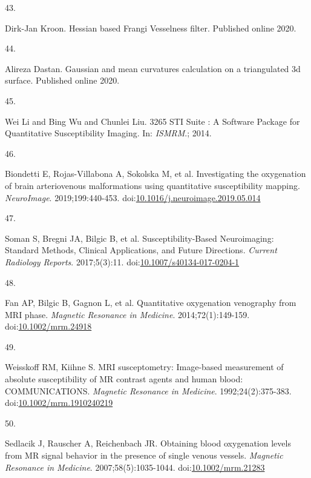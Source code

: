 \documentclass[
  letterpaper,
  DIV=11,
  numbers=noendperiod]{scrartcl}
\newlength{\cslhangindent}
\newlength{\csllabelwidth}
\newenvironment{CSLReferences}[2] %
 {\begin{list}{}{%
  \setlength{\itemindent}{0pt}
  \setlength{\leftmargin}{0pt}
  \setlength{\parsep}{0pt}
  \ifodd #1
   \setlength{\leftmargin}{\cslhangindent}
   \setlength{\itemindent}{-1\cslhangindent}
  \fi
  \setlength{\itemsep}{#2\baselineskip}}}
 {\end{list}}
\newcommand{\CSLLeftMargin}[1]{\parbox[t]{\csllabelwidth}{\strut#1\strut}}
\newcommand{\CSLRightInline}[1]{\parbox[t]{\linewidth - \csllabelwidth}{\strut#1\strut}}
\begin{document}
\begin{CSLReferences}{0}{1}
\CSLLeftMargin{43. }%
\CSLRightInline{Dirk-Jan Kroon. Hessian based {Frangi Vesselness}
filter. Published online 2020.}

\CSLLeftMargin{44. }%
\CSLRightInline{Alireza Dastan. Gaussian and mean curvatures calculation
on a triangulated 3d surface. Published online 2020.}

\CSLLeftMargin{45. }%
\CSLRightInline{Wei Li and Bing Wu and Chunlei Liu. 3265 {STI Suite} : A
{Software Package} for {Quantitative Susceptibility Imaging}. In:
\emph{{ISMRM}}.; 2014.}

\CSLLeftMargin{46. }%
\CSLRightInline{Biondetti E, Rojas-Villabona A, Sokolska M, et al.
Investigating the oxygenation of brain arteriovenous malformations using
quantitative susceptibility mapping. \emph{NeuroImage}.
2019;199:440-453.
doi:\href{https://doi.org/10.1016/j.neuroimage.2019.05.014}{10.1016/j.neuroimage.2019.05.014}}

\CSLLeftMargin{47. }%
\CSLRightInline{Soman S, Bregni JA, Bilgic B, et al.
Susceptibility-{Based Neuroimaging}: {Standard Methods}, {Clinical
Applications}, and {Future Directions}. \emph{Current Radiology
Reports}. 2017;5(3):11.
doi:\href{https://doi.org/10.1007/s40134-017-0204-1}{10.1007/s40134-017-0204-1}}

\CSLLeftMargin{48. }%
\CSLRightInline{Fan AP, Bilgic B, Gagnon L, et al. Quantitative
oxygenation venography from {MRI} phase. \emph{Magnetic Resonance in
Medicine}. 2014;72(1):149-159.
doi:\href{https://doi.org/10.1002/mrm.24918}{10.1002/mrm.24918}}

\CSLLeftMargin{49. }%
\CSLRightInline{Weisskoff RM, Kiihne S. {MRI} susceptometry:
{Image-based} measurement of absolute susceptibility of {MR} contrast
agents and human blood: {COMMUNICATIONS}. \emph{Magnetic Resonance in
Medicine}. 1992;24(2):375-383.
doi:\href{https://doi.org/10.1002/mrm.1910240219}{10.1002/mrm.1910240219}}

\CSLLeftMargin{50. }%
\CSLRightInline{Sedlacik J, Rauscher A, Reichenbach JR. Obtaining blood
oxygenation levels from {MR} signal behavior in the presence of single
venous vessels. \emph{Magnetic Resonance in Medicine}.
2007;58(5):1035-1044.
doi:\href{https://doi.org/10.1002/mrm.21283}{10.1002/mrm.21283}}


\end{CSLReferences}
\end{document}
